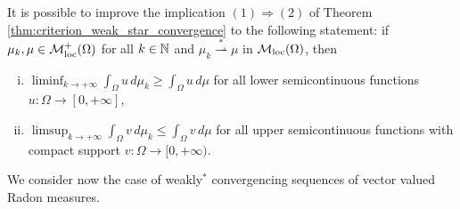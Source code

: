 \begin{remark}
It is possible to improve the implication $(1) \Rightarrow (2)$ of Theorem \ref{thm:criterion_weak_star_convergence} to the following statement: if $\mu_{k}, \mu \in \mathcal{M}^{+}_{\rm loc}(\Omega)$ for all $k \in \mathbb{N}$ and $\mu_k \stackrel {*}{\rightharpoonup} \mu$ in $\mathcal{M}_{\rm loc}(\Omega)$, then
\begin{enumerate}[i)]
\item $\displaystyle \liminf_{k \to + \infty} \int_{\Omega} u \, d \mu_{k} \ge \int_{\Omega} u \, d \mu$ for all lower semicontinuous functions $u: \Omega \to [0, + \infty]$, 
\item $\displaystyle \limsup_{k \to + \infty} \int_{\Omega} v \, d \mu_{k} \le \int_{\Omega} v \, d\mu$ for all upper semicontinuous functions with compact support $v : \Omega \to [0, + \infty)$.
\end{enumerate}
\end{remark}

We consider now the case of weakly$^{*}$ convergencing sequences of vector valued Radon measures.

